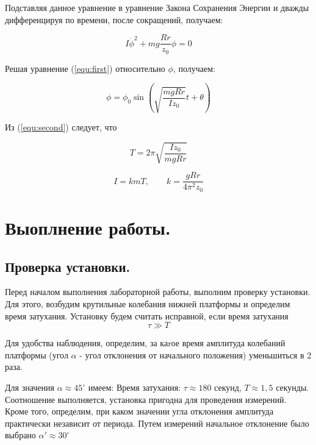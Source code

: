 \documentclass[12pt,a4paper]{article}
\begin{document}
		Подставляя данное уравнение в уравнение Закона Сохранения Энергии и дважды дифференцируя по 				времени, после сокращений, получаем:
		
	\begin{equation}
		 I\ddot{\phi}^2 + mg\frac{Rr}{z_{0}}\phi = 0 
		 \label{equ:first}	
	\end{equation}
	
	
		Решая уравнение (\ref{equ:first}) относительно $\phi$, получаем:
			
	
	\begin{equation}
		\phi = \phi_{0}\sin\left(\sqrt{\frac{mgRr}{Iz_{0}}}t + \theta\right)
		\label{equ:second}
	\end{equation}
	
	
	Из (\ref{equ:second}) следует, что 
	
	\begin{equation}
		T = 2\pi\sqrt{\frac{Iz_{0}}{mgRr}}		
	\end{equation}
	
	\begin{equation}
		I = kmT, \qquad k = \frac{gRr}{4\pi^2z_{0}} 
		\label{equ:four}
	\end{equation}

	\newpage	

\section{Выоплнение работы.}

	\subsection{Проверка установки.}
		
		\qquad  Перед началом выполнения лабораторной работы, выполним проверку установки. Для этого, возбудим крутильные колебания нижней платформы и определим время затухания. Установку будем считать исправной, если время затухания $$\tau \gg T$$
		
		Для удобства наблюдения, определим, за каrое время амплитуда колебаний платформы (угол $\alpha$ - угол отклонения от начального положения) уменьшиться в 2 раза.
		
		Для значения $\alpha \approx 45^{\circ}$ имеем: Время затухания: $\tau \approx 180$ секунд, $T \approx 1,5$ секунды. Соотношение выполняется, установка пригодна для проведения измерений. Кроме того, определим, при каком значении угла отклонения амплитуда практически независит от периода. Путем измерений начальное отклонение было выбрано $\alpha' \approx 30^{\circ}$
		
\end{document}
